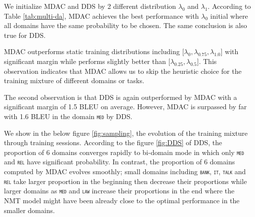 \documentclass[11pt]{article}
\newcommand{\domain}[1]{\texttt{\textsc{#1}}}
\begin{document}
We initialize MDAC and DDS by 2 different distribution $\lambda_0$ and $\lambda_1$. According to Table \ref{tab:multi-da}, MDAC achieves the best performance with $\lambda_0$ initial where all domains have the same probability to be chosen. The same conclusion is also true for DDS.

MDAC outperforms static training distributions including $\big[ \lambda_0, \lambda_{0.75}, \lambda_{1.0}\big]$ with significant margin while performs slightly better than $\big[ \lambda_{0.25}, \lambda_{0.5} \big]$. This observation indicates that MDAC allows us to skip the heuristic choice for the training mixture of different domains or tasks.

The second observation is that DDS is again outperformed by MDAC with a significant margin of 1.5 BLEU on average. However, MDAC is surpassed by far with 1.6 BLEU in the domain \domain{med} by DDS. 

We show in the below figure \ref{fig:sampling}, the evolution of the training mixture through training sessions. According to the figure \ref{fig:DDS} of DDS, the proportion of 6 domains converges rapidly to bi-domain mode in which only \domain{med} and \domain{rel} have significant probability. In contrast, the proportion of 6 domains computed by MDAC evolves smoothly; small domains including \domain{bank}, \domain{it}, \domain{talk} and \domain{rel} take larger proportion in the beginning then decrease their proportions while larger domains as \domain{med} and \domain{law} increase their proportions in the end where the NMT model might have been already close to the optimal performance in the smaller domains.
\end{document}
